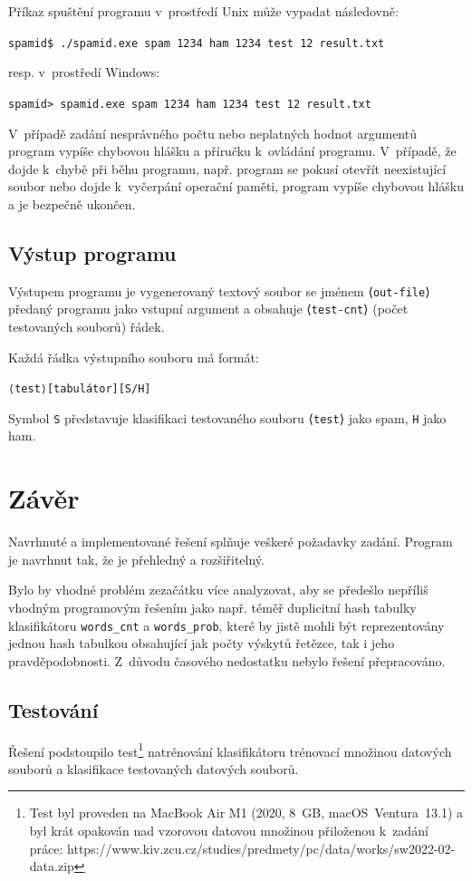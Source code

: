 \documentclass[a4paper, 12pt]{report}
\begin{document}
Příkaz spuštění programu v~prostředí Unix může vypadat následovně:

\texttt{spamid\$ ./spamid.exe spam 1234 ham 1234 test 12 result.txt}

resp. v~prostředí Windows:

\texttt{spamid> spamid.exe spam 1234 ham 1234 test 12 result.txt}

V~případě zadání nesprávného počtu nebo neplatných hodnot argumentů 
program vypíše chybovou hlášku a příručku k~ovládání programu. V~případě, 
že dojde k~chybě při běhu programu, např. program se pokusí otevřít 
neexistující soubor nebo dojde k~vyčerpání operační paměti, program vypíše 
chybovou hlášku a je bezpečně ukončen.

\section{Výstup programu}

Výstupem programu je vygenerovaný textový soubor se jménem 
⟨\texttt{out-file}⟩ předaný programu jako vstupní argument a obsahuje 
⟨\texttt{test-cnt}⟩ (počet testovaných souborů) řádek.

Každá řádka výstupního souboru má formát:

\texttt{⟨test⟩[tabulátor][S/H]}

Symbol \texttt{S} představuje klasifikaci testovaného souboru 
⟨\texttt{test}⟩ jako spam, \texttt{H} jako ham.

\chapter{Závěr}

Navrhnuté a implementované řešení splňuje veškeré požadavky zadání. 
Program je navrhnut tak, že je přehledný a rozšiřitelný.

Bylo by vhodné problém zezačátku více analyzovat, aby se předešlo nepříliš 
vhodným programovým řešením jako např. téměř duplicitní hash tabulky 
klasifikátoru \texttt{words\_cnt} a \texttt{words\_prob}, které by jistě 
mohli být reprezentovány jednou hash tabulkou obsahující jak počty výskytů 
řetězce, tak i jeho pravděpodobnosti. Z~důvodu časového nedostatku nebylo 
řešení přepracováno.

\section{Testování}

Řešení podstoupilo test\footnote{Test byl proveden na MacBook Air M1 
(2020, 8~GB, macOS~Ventura~13.1) a byl krát opakován nad 
vzorovou datovou množinou přiloženou k~zadání práce: 
https://www.kiv.zcu.cz/studies/predmety/pc/data/works/sw2022-02-data.zip} 
natrénování klasifikátoru trénovací množinou datových souborů a 
klasifikace testovaných datových souborů.
\end{document}
